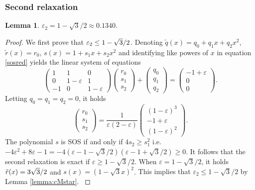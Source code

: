 \documentclass[a4paper,12pt]{article}
\newtheorem{lemma}{Lemma}
\newcommand{\revise}[1]{{\color{black}#1}}
\begin{document}
\subsubsection{Second relaxation}
{
\begin{lemma}
\label{lemma:eps2}
$\varepsilon_2 = 1-\sqrt{3}/2 \approx 0.1340$.
\end{lemma}
}
%
\begin{proof}
We first prove that $\revise{\varepsilon}_2 \leq 1-\sqrt{3}/2$. 
Denoting ${\tilde{q}}(x)=q_0+q_1x+q_2x^2$, ${\tilde{r}}(x)=r_0$, $s(x)=1+s_1x+s_2x^2$ and identifying like powers of $x$ in equation \eqref{sosred} yields the linear system of equations
\[
\left(\begin{array}{ccc}
1 & 1 & 0 \\
0 & 1-\varepsilon & 1\\
-1 & 0 & 1-\varepsilon
\end{array}\right)
\left(\begin{array}{c}
r_0 \\ s_1 \\ s_2 
\end{array}\right)
+ \left(\begin{array}{c}
q_0 \\ q_1 \\ q_2 
\end{array}\right)=
\left(\begin{array}{c}
-1+\varepsilon \\ 0 \\ 0 
\end{array}\right).
\]
Letting $q_0=q_1=q_2=0$, it holds
\[
\left(\begin{array}{c}
r_0 \\ s_1 \\ s_2 
\end{array}\right)=
\frac{1}{\varepsilon(2-\varepsilon)}
\left(\begin{array}{c}
(1-\varepsilon)^3 \\ -1+\varepsilon \\(1-\varepsilon)^2 
\end{array}\right).
\]
The polynomial $s$ is SOS if and only if $4 s_2 \geq s^2_1$ i.e. $-4\varepsilon^2+8\varepsilon-1=-4(\varepsilon - 1 - \sqrt{3}/2)(\varepsilon - 1 + \sqrt{3}/2)\geq 0$. It follows that the second relaxation is exact if $\varepsilon \geq 1-\sqrt{3}/2$. When $\varepsilon = 1-\sqrt{3}/2$, it holds $\revise{\tilde{r}}(x)=3\sqrt{3}/2$ and $s(x)=(1-\sqrt{3}x)^2$. 
{This implies that $\varepsilon_2 \leq 1 - \sqrt{3}/2$ by Lemma \ref{lemma:cMstar}. }


\end{proof}
\end{document}
